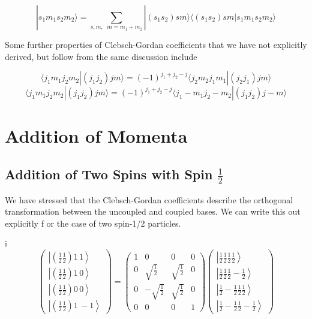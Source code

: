 \[
|s_1m_1s_2m_2\rangle = \sum_{s,m, \; \; m = m_1 + m_2}^{} |(s_1s_2) sm\rangle
\langle (s_1 s_2) sm | s_1m_1s_2m_2\rangle 
\] \vspace{3px}

Some further properties of Clebsch-Gordan coefficients that we have not
explicitly derived, but follow from the same discussion include 

\[ \langle j_1 m_1 j_2 m_2 | (j_1j_2) jm \rangle = (-1)^{j_1+j_2-j} \langle
j_2m_2 j_1 m_1 | (j_2 j_1 ) jm \rangle \] 
\[ \langle j_1 m_1 j_2 m_2 | (j_1j_2) jm \rangle = (-1)^{j_1+j_2-j} \langle j_1
  - m_1 j_2 - m_2 | (j_1 j_2) j - m\rangle \] \vspace{3px}


\section{Addition of Momenta}

\subsection{Addition of Two Spins with Spin $\frac{1}{2}$}

We have stressed that the Clebsch-Gordan coefficients describe the orthogonal
transformation between the uncoupled and coupled bases. We can write this out
explicitly f or the case of two spin-1/2 particles. 

i\[
\left(
\begin{array}{c}
\left| \left(\frac{1}{2} \frac{1}{2}\right) 1 \, 1 \right\rangle \\[3mm]
\left| \left(\frac{1}{2} \frac{1}{2}\right) 1 \, 0 \right\rangle \\[3mm]
\left| \left(\frac{1}{2} \frac{1}{2}\right) 0 \, 0 \right\rangle \\[3mm]
\left| \left(\frac{1}{2} \frac{1}{2}\right) 1 \, -1 \right\rangle
\end{array}
\right)
=
\left(
\begin{array}{cccc}
  1 & 0 & 0 & 0 \\[3mm]
0 & \sqrt{\frac{1}{2}} & \sqrt{\frac{1}{2}} & 0 \\[3mm]
0 & -\sqrt{\frac{1}{2}} & \sqrt{\frac{1}{2}} & 0 \\[3mm]
0 & 0 & 0 & 1
\end{array}
\right)
\left(
\begin{array}{c}
\left| \frac{1}{2} \frac{1}{2} \frac{1}{2} \frac{1}{2} \right\rangle \\[3mm]
\left| \frac{1}{2} \frac{1}{2} \frac{1}{2} -\frac{1}{2} \right\rangle \\[3mm]
\left| \frac{1}{2} -\frac{1}{2} \frac{1}{2} \frac{1}{2} \right\rangle \\[3mm]
\left| \frac{1}{2} -\frac{1}{2} \frac{1}{2} -\frac{1}{2} \right\rangle
\end{array}
\right)
\] \vspace{3px} 


